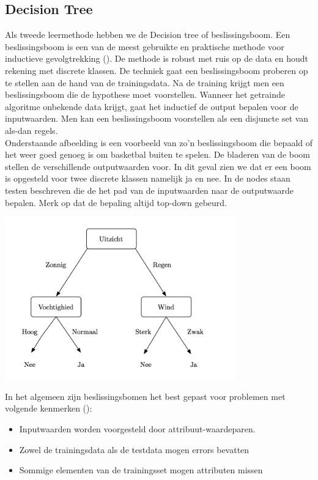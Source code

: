 \subsection{Decision Tree}\label{Decision Tree}
%
Als tweede leermethode hebben we de Decision tree of beslissingsboom. Een beslissingsboom is een van de meest gebruikte en praktische methode voor inductieve gevolgtrekking (\cite{mitchell1997machine}). De methode is robust met ruis op de data en houdt rekening met discrete klassen. De techniek gaat een beslissingsboom proberen op te stellen aan de hand van de trainingsdata. Na de training krijgt men een beslissingsboom die de hypothese moet voorstellen. Wanneer het getrainde algoritme onbekende data krijgt, gaat het inductief de output bepalen voor de inputwaarden. Men kan een beslissingsboom voorstellen als een disjuncte set van als-dan regels.\\ 
%
Onderstaande afbeelding is een voorbeeld van zo'n beslissingsboom die bepaald of het weer goed genoeg is om basketbal buiten te spelen. De bladeren van de boom stellen de verschillende outputwaarden voor. In dit geval zien we dat er een boom is opgesteld voor twee discrete klassen namelijk ja en nee. In de nodes staan testen beschreven die de het pad van de inputwaarden naar de outputwaarde bepalen. Merk op dat de bepaling altijd top-down gebeurd.
%
\begin{center}
  \includegraphics[width=10cm]{decisiontree}
  \label{fig:beslissingsboom}
\end{center}
%
In het algemeen zijn beslissingsbomen het best gepast voor problemen met volgende kenmerken (\cite{mitchell1997machine}): 

\begin{itemize}
  \item{Inputwaarden worden voorgesteld door attribuut-waardeparen.}
  \item{Zowel de trainingsdata als de testdata mogen errors bevatten}
  \item{Sommige elementen van de trainingsset mogen attributen missen}
\end{itemize}

